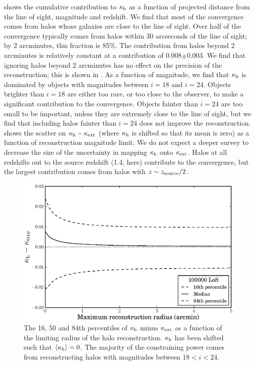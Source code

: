 \documentclass[useAMS,usenatbib,a4paper]{mn2e}
\begin{document}
 shows the cumulative contribution to $\kappa_{\rm h}$ as a function
of projected distance from the line of sight, magnitude and redshift. We find
that most of the convergence comes from halos whose galaxies are close to the
line of sight.  Over half of the  convergence typically comes from halos
within 30 arcseconds of the line of sight; by 2 arcminutes, this fraction is
85\%. The contribution from halos beyond 2 arcminutes is relatively constant
at a contribution of 0.008$\pm$0.003. We find that ignoring halos beyond 2
arcminutes has no effect on the precision of the reconstruction; this is shown
in . As a function of magnitude, we find that $\kappa_{\rm h}$
is dominated by objects with magnitudes between $i=18$ and $i=24$. Objects
brighter than $i=18$ are either too rare, or too close to the observer, to
make a significant contribution to the convergence. Objects fainter than
$i=24$ are too small to be important, unless they are extremely close to the
line of sight, but we find that including halos fainter than $i=24$ does not
improve the reconstruction.   shows the scatter on
$\kappa_{\rm h}-\kappa_{\rm ext}$ (where $\kappa_{\rm h}$ is shifted so that its mean is zero) as a
function of reconstruction magnitude limit. We do
not expect a deeper survey to decrease the size of the uncertainty in mapping
$\kappa_{\rm h}$ onto $\kappa_{\rm ext}$. Halos at all redshifts out to the source redshift
(1.4, here) contribute to the convergence, but the largest contribution comes from
halos with $z \sim z_{\rm source}/2$.

\begin{figure}
\includegraphics[width=\columnwidth]{figs/radius_scatter.eps}
\caption[magcut]{The 16, 50 and 84th percentiles of $\kappa_{\rm h}$ minus
$\kappa_{\rm ext}$ as a function of the limiting radius of the halo
reconstruction. $\kappa_{\rm h}$ has been shifted such that
$\left\langle\kappa_{\rm h}\right\rangle=0$. The majority of the constraining power
comes from reconstructing halos with magnitudes between $18<i<24$.}
\label{fig:radcut}
\end{figure}
\end{document}
